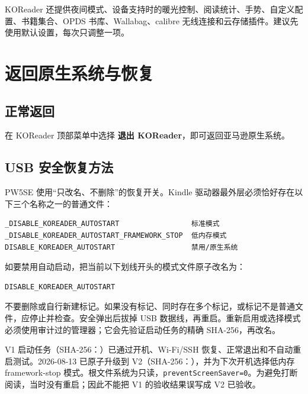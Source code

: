 \documentclass[10pt,a4paper]{article}
\begin{document}
KOReader 还提供夜间模式、设备支持时的暖光控制、阅读统计、手势、自定义配置、书籍集合、OPDS 书库、Wallabag、calibre 无线连接和云存储插件。建议先使用默认设置，每次只调整一项。

\section{返回原生系统与恢复}

\subsection{正常返回}

在 KOReader 顶部菜单中选择 \textbf{退出 KOReader}，即可返回亚马逊原生系统。

\subsection{USB 安全恢复方法}

PW5SE 使用“只改名、不删除”的恢复开关。Kindle 驱动器最外层必须恰好存在以下三个名称之一的普通文件：

\begin{Verbatim}[fontsize=\small]
_DISABLE_KOREADER_AUTOSTART                 标准模式
_DISABLE_KOREADER_AUTOSTART_FRAMEWORK_STOP  低内存模式
DISABLE_KOREADER_AUTOSTART                  禁用/原生系统
\end{Verbatim}

如要禁用自动启动，把当前以下划线开头的模式文件原子改名为：

\begin{Verbatim}[fontsize=\small]
DISABLE_KOREADER_AUTOSTART
\end{Verbatim}

不要删除或自行新建标记。如果没有标记、同时存在多个标记，或标记不是普通文件，应停止并检查。安全弹出后拔掉 USB 数据线，再重启。重新启用或选择模式必须使用审计过的管理器；它会先验证启动任务的精确 SHA-256，再改名。

\begin{warningbox}
V1 启动任务（SHA-256：）已通过开机、Wi-Fi/SSH 恢复、正常退出和不自动重启测试。2026-08-13 已原子升级到 V2（SHA-256：），并为下次开机选择低内存 framework-stop 模式。根文件系统为只读，\texttt{preventScreenSaver=0}。为避免打断阅读，当时没有重启；因此不能把 V1 的验收结果误写成 V2 已验收。
\end{warningbox}
\end{document}
